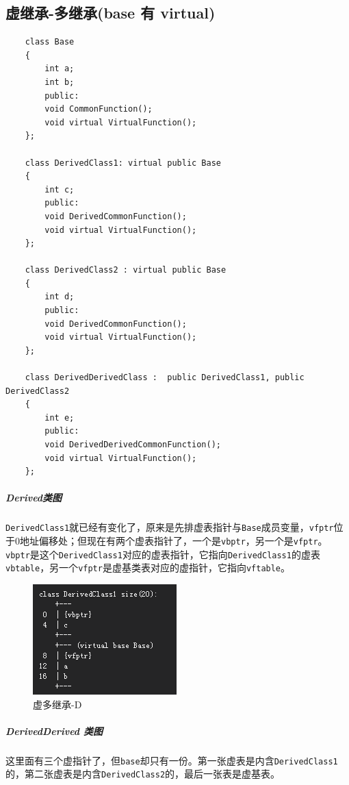\documentclass[UTF8,a4paper,12pt]{ctexbook} %
\begin{document}
		\subsection{虚继承-多继承(base  有 virtual)}
			\begin{lstlisting}
	class Base
	{
		int a;
		int b;
		public:
		void CommonFunction();
		void virtual VirtualFunction();
	};	
	
	class DerivedClass1: virtual public Base
	{
		int c;
		public:
		void DerivedCommonFunction();
		void virtual VirtualFunction();
	};
	
	class DerivedClass2 : virtual public Base
	{
		int d;
		public:
		void DerivedCommonFunction();
		void virtual VirtualFunction();
	};
	
	class DerivedDerivedClass :  public DerivedClass1, public DerivedClass2
	{
		int e;
		public:
		void DerivedDerivedCommonFunction();
		void virtual VirtualFunction();
	};
			\end{lstlisting}
			
			\subparagraph{Derived类图}
			
				\verb|DerivedClass1|就已经有变化了，原来是先排虚表指针与\verb|Base|成员变量，\verb|vfptr|位于0地址偏移处；但现在有两个虚表指针了，一个是\verb|vbptr|，另一个是\verb|vfptr|。\verb|vbptr|是这个\verb|DerivedClass1|对应的虚表指针，它指向\verb|DerivedClass1|的虚表\verb|vbtable|，另一个\verb|vfptr|是虚基类表对应的虚指针，它指向\verb|vftable|。
				
				\begin{figure}[H]
					\centering
					\includegraphics[scale = 0.8]{Derived.png}
					\caption{虚多继承-D}
				\end{figure}
			
			\subparagraph{DerivedDerived  类图}
				
				这里面有三个虚指针了，但\verb|base|却只有一份。第一张虚表是内含\verb|DerivedClass1|的，第二张虚表是内含\verb|DerivedClass2|的，最后一张表是虚基表。
				
\end{document}

